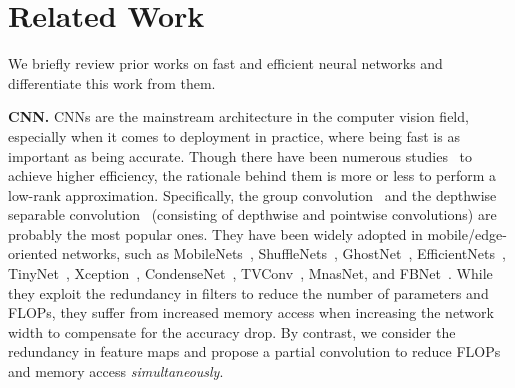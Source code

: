 \section{Related Work}
\label{sec:related_work}
We briefly review prior works on fast and efficient neural networks and differentiate this work from them.

\medskip\noindent\textbf{CNN.} \enspace
CNNs are the mainstream architecture in the computer vision field, especially when it comes to deployment in practice, where being fast is as important as being accurate. Though there have been numerous studies~\cite{sifre2014rigid,singh2019hetconv,chen2019drop,chollet2017xception,zhang2017interleaved,li2021micronet,he2022tackling,zhuo2022semi} to achieve higher efficiency, the rationale behind them is more or less to perform a low-rank approximation. Specifically, the group convolution~\cite{krizhevsky2012imagenet} and the depthwise separable convolution~\cite{sifre2014rigid} (consisting of depthwise and pointwise convolutions) are probably the most popular ones. They have been widely adopted in mobile/edge-oriented networks, such as MobileNets~\cite{howard2017mobilenets,sandler2018mobilenetv2,howard2019searching},
ShuffleNets~\cite{zhang2018shufflenet,ma2018shufflenet}, GhostNet~\cite{han2020ghostnet},
EfficientNets~\cite{tan2019efficientnet,tan2021efficientnetv2}, TinyNet~\cite{han2020model}, Xception~\cite{chollet2017xception}, CondenseNet~\cite{huang2018condensenet,yang2021condensenet}, TVConv~\cite{chen2022tvconv}, MnasNet\cite{tan2019mnasnet}, and FBNet~\cite{wu2019fbnet}. While they exploit the redundancy in filters to reduce the number of parameters and FLOPs, they suffer from increased memory access when increasing the network width to compensate for the accuracy drop. By contrast, we consider the redundancy in feature maps and propose a partial convolution to reduce FLOPs and memory access \emph{simultaneously}. 

